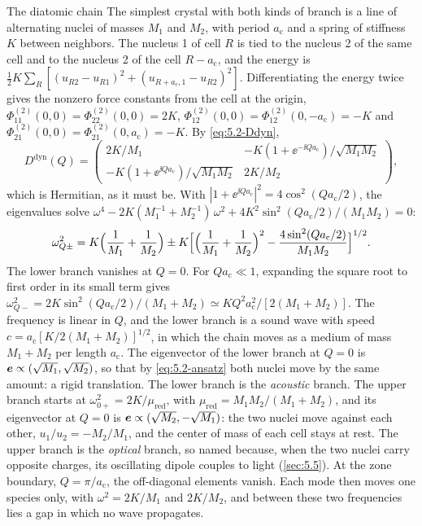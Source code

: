 \begin{workedexample}{The diatomic chain}\label{we:5-chain}
The simplest crystal with both kinds of branch is a line of alternating nuclei of masses $M_1$ and $M_2$, with period $a_{\mathrm{c}}$ and a spring of stiffness $K$ between neighbors. The nucleus 1 of cell $R$ is tied to the nucleus 2 of the same cell and to the nucleus 2 of the cell $R - a_{\mathrm{c}}$, and the energy is $\tfrac12K\sum_R[(u_{R2} - u_{R1})^2 + (u_{R+a_{\mathrm{c}},1} - u_{R2})^2]$. Differentiating the energy twice gives the nonzero force constants from the cell at the origin, $\Phi^{(2)}_{11}(0,0) = \Phi^{(2)}_{22}(0,0) = 2K$, $\Phi^{(2)}_{12}(0,0) = \Phi^{(2)}_{12}(0,-a_{\mathrm{c}}) = -K$ and $\Phi^{(2)}_{21}(0,0) = \Phi^{(2)}_{21}(0,a_{\mathrm{c}}) = -K$. By \cref{eq:5.2-Ddyn},
\begin{equation*}
  D^{\mathrm{dyn}}(Q) = \begin{pmatrix} 2K/M_1 & -K(1 + \ee^{-\ii Qa_{\mathrm{c}}})/\sqrt{M_1M_2} \\ -K(1 + \ee^{\ii Qa_{\mathrm{c}}})/\sqrt{M_1M_2} & 2K/M_2 \end{pmatrix} ,
\end{equation*}
which is Hermitian, as it must be. With $|1 + \ee^{\ii Qa_{\mathrm{c}}}|^2 = 4\cos^2(Qa_{\mathrm{c}}/2)$, the eigenvalues solve $\omega^4 - 2K(M_1^{-1} + M_2^{-1})\,\omega^2 + 4K^2\sin^2(Qa_{\mathrm{c}}/2)/(M_1M_2) = 0$:
\begin{equation*}
  \omega_{Q\pm}^2 = K\Bigl(\frac{1}{M_1} + \frac{1}{M_2}\Bigr) \pm K\Bigl[\Bigl(\frac{1}{M_1} + \frac{1}{M_2}\Bigr)^2 - \frac{4\sin^2(Qa_{\mathrm{c}}/2)}{M_1M_2}\Bigr]^{1/2} .
\end{equation*}
The lower branch vanishes at $Q = 0$. For $Qa_{\mathrm{c}} \ll 1$, expanding the square root to first order in its small term gives $\omega_{Q-}^2 = 2K\sin^2(Qa_{\mathrm{c}}/2)/(M_1 + M_2) \simeq KQ^2a_{\mathrm{c}}^2/[2(M_1 + M_2)]$. The frequency is linear in $Q$, and the lower branch is a sound wave with speed $c = a_{\mathrm{c}}[K/2(M_1 + M_2)]^{1/2}$, in which the chain moves as a medium of mass $M_1 + M_2$ per length $a_{\mathrm{c}}$. The eigenvector of the lower branch at $Q = 0$ is $\bm{e} \propto (\sqrt{M_1}, \sqrt{M_2})$, so that by \cref{eq:5.2-ansatz} both nuclei move by the same amount: a rigid translation. The lower branch is the \emph{acoustic} branch. The upper branch starts at $\omega_{0+}^2 = 2K/\mu_{\mathrm{red}}$, with $\mu_{\mathrm{red}} = M_1M_2/(M_1 + M_2)$, and its eigenvector at $Q = 0$ is $\bm{e} \propto (\sqrt{M_2}, -\sqrt{M_1})$: the two nuclei move against each other, $u_1/u_2 = -M_2/M_1$, and the center of mass of each cell stays at rest. The upper branch is the \emph{optical} branch, so named because, when the two nuclei carry opposite charges, its oscillating dipole couples to light (\cref{sec:5.5}). At the zone boundary, $Q = \pi/a_{\mathrm{c}}$, the off-diagonal elements vanish. Each mode then moves one species only, with $\omega^2 = 2K/M_1$ and $2K/M_2$, and between these two frequencies lies a gap in which no wave propagates.


\end{workedexample}

